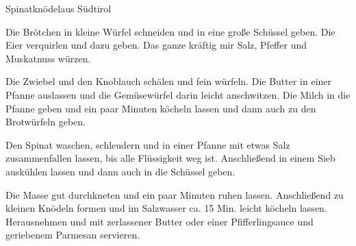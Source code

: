 \begin{recipe}{Spinatknödel}{aus Südtirol}
  \inglist

  \steps

  Die Brötchen in kleine Würfel schneiden und in eine große Schüssel geben. Die
  Eier verquirlen und dazu geben. Das ganze kräftig mir Salz, Pfeffer und
  Muskatnuss würzen.

  Die Zwiebel und den Knoblauch schälen und fein würfeln. Die Butter in einer
  Pfanne auslassen und die Gemüsewürfel darin leicht anschwitzen. Die Milch in
  die Pfanne geben und ein paar Minuten köcheln lassen und dann auch zu den
  Brotwürfeln geben.

  Den Spinat waschen, schleudern und in einer Pfanne mit etwas Salz
  zusammenfallen lassen, bis alle Flüssigkeit weg ist. Anschließend in einem
  Sieb auskühlen lassen und dann auch in die Schüssel geben.

  Die Masse gut durchkneten und ein paar Minuten ruhen lassen. Anschließend zu
  kleinen Knödeln formen und im Salzwasser ca. 15 Min. leicht köcheln lassen.
  Herausnehmen und mit zerlassener Butter oder einer Pfifferlingsauce und
  geriebenem Parmesan servieren.

\end{recipe}
